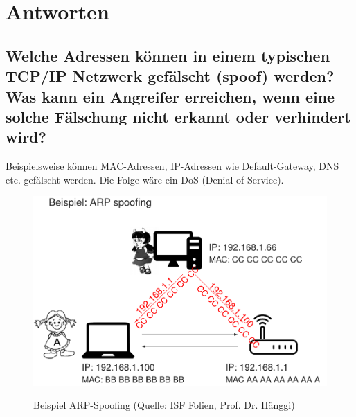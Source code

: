 \section{Antworten}
\subsection*{Welche Adressen können in einem typischen TCP/IP Netzwerk gefälscht (spoof) werden? Was kann ein Angreifer erreichen, wenn eine solche Fälschung nicht erkannt oder verhindert wird?}
Beispielsweise können MAC-Adressen, IP-Adressen wie Default-Gateway, DNS etc. gefälscht werden. Die Folge wäre ein DoS (Denial of Service).

\begin{figure}[H]
    \begin{center}
    \label{pic:Spoofing}
    \includegraphics[width=\textwidth]{images/ARP_Spoofing.png}
    \caption{Beispiel ARP-Spoofing (Quelle: ISF Folien, Prof. Dr. Hänggi)}
    \end{center}
\end{figure}

